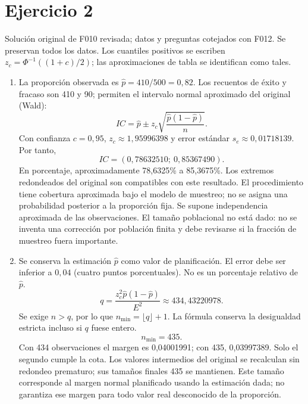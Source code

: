 \documentclass[11pt]{article}
\begin{document}
\section*{Ejercicio 2}
Solución original de F010 revisada; datos y preguntas cotejados con F012. Se preservan todos los datos. Los cuantiles positivos se escriben $z_c=\Phi^{-1}((1+c)/2)$; las aproximaciones de tabla se identifican como tales.
\begin{enumerate}[label=(\alph*)]\item La proporción observada es $\widehat p=410/500=0,82$. Los recuentos de éxito y fracaso son 410 y 90; permiten el intervalo normal aproximado del original (Wald):
\[IC=\widehat p\pm z_c\sqrt{\frac{\widehat p(1-\widehat p)}{n}}.\]
Con confianza $c=0,95$, $z_c\approx1,95996398$ y error estándar $s_e\approx0,01718139$. Por tanto,
\[IC=\boxed{(0,78632510;\ 0,85367490)}.\]
En porcentaje, aproximadamente 78,6325\% a 85,3675\%. Los extremos redondeados del original son compatibles con este resultado.
El procedimiento tiene cobertura aproximada bajo el modelo de muestreo; no se asigna una probabilidad posterior a la proporción fija. Se supone independencia aproximada de las observaciones. El tamaño poblacional no está dado: no se inventa una corrección por población finita y debe revisarse si la fracción de muestreo fuera importante.
\item Se conserva la estimación $\widehat p$ como valor de planificación. El error debe ser inferior a $0,04$ (cuatro puntos porcentuales). No es un porcentaje relativo de $\widehat p$.
\[q=\frac{z_c^2\widehat p(1-\widehat p)}{E^2}\approx434,43220978.\]
Se exige $n>q$, por lo que $n_{\min}=\lfloor q\rfloor+1$. La fórmula conserva la desigualdad estricta incluso si $q$ fuese entero.
\[\boxed{n_{\min}=435}.\]
Con 434 observaciones el margen es 0,04001991; con 435, 0,03997389. Solo el segundo cumple la cota.
Los valores intermedios del original se recalculan sin redondeo prematuro; sus tamaños finales 435 se mantienen. Este tamaño corresponde al margen normal planificado usando la estimación dada; no garantiza ese margen para todo valor real desconocido de la proporción.
\end{enumerate}
\clearpage
\end{document}
